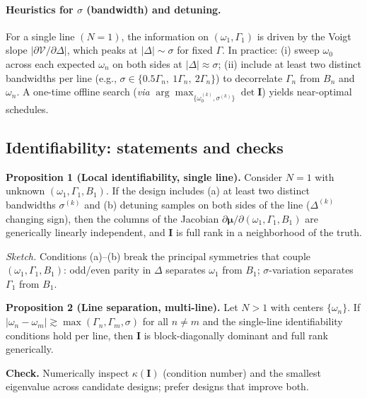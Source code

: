 \documentclass[aps,prb,amsmath,amssymb]{revtex4-2} %
\begin{document}
        \paragraph*{Heuristics for $\sigma$ (bandwidth) and detuning.}
            For a single line $(N=1)$, the information on $(\omega_1,\Gamma_1)$ is driven by the Voigt slope
            $|\partial \mathcal{V}/\partial \Delta|$, which peaks at $|\Delta|\sim \sigma$ for fixed $\Gamma$.
            In practice:
            (i) sweep $\omega_0$ across each expected $\omega_n$ on both sides at $|\Delta|\approx\sigma$;
            (ii) include at least two distinct bandwidths per line (e.g., $\sigma\in\{0.5\Gamma_n,\ 1\Gamma_n,\ 2\Gamma_n\}$)
            to decorrelate $\Gamma_n$ from $B_n$ and $\omega_n$.
            A one-time offline search (\emph{via} $\arg\max_{\{\omega_0^{(k)},\sigma^{(k)}\}} \det\mathbf I$) yields near-optimal schedules.

\subsection{Identifiability: statements and checks}
    \textbf{Proposition 1 (Local identifiability, single line).}
    Consider $N=1$ with unknown $(\omega_1,\Gamma_1,B_1)$.
    If the design includes (a) at least two distinct bandwidths $\sigma^{(k)}$ and
    (b) detuning samples on both sides of the line ($\Delta^{(k)}$ changing sign),
    then the columns of the Jacobian $\partial \boldsymbol{\mu}/\partial(\omega_1,\Gamma_1,B_1)$
    are generically linearly independent, and $\mathbf I$ is full rank in a neighborhood of the truth.

    \emph{Sketch.} Conditions (a)–(b) break the principal symmetries that couple $(\omega_1,\Gamma_1,B_1)$:
    odd/even parity in $\Delta$ separates $\omega_1$ from $B_1$; $\sigma$-variation separates $\Gamma_1$ from $B_1$.

    \textbf{Proposition 2 (Line separation, multi-line).}
    Let $N>1$ with centers $\{\omega_n\}$. If $|\omega_n-\omega_m|\gtrsim\max(\Gamma_n,\Gamma_m,\sigma)$
    for all $n\neq m$ and the single-line identifiability conditions hold per line, then
    $\mathbf I$ is block-diagonally dominant and full rank generically.

    \textbf{Check.} Numerically inspect $\kappa(\mathbf I)$ (condition number) and the smallest eigenvalue across candidate designs; prefer designs that improve both.
\end{document}
